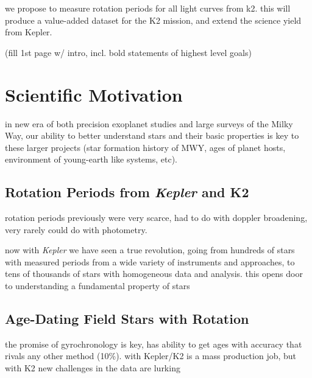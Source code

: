 \documentclass[12pt]{article}
\newcommand{\Kepler}{\textsl{Kepler}\xspace}
\begin{document}
we propose to measure rotation periods for all light curves from k2. this will produce a value-added dataset for the K2 mission, and extend the science yield from Kepler.

(fill 1st page w/ intro, incl. bold statements of highest level goals)
\clearpage



\section{Scientific Motivation}
in new era of both precision exoplanet studies and large surveys of the Milky Way, our ability to better understand stars and their basic properties is key to these larger projects (star formation history of MWY, ages of planet hosts, environment of young-earth like systems, etc).


\subsection{Rotation Periods from \Kepler and K2}
rotation periods previously were very scarce, had to do with doppler broadening, very rarely could do with photometry.

now with \Kepler we have seen a true revolution, going from hundreds of stars with measured periods from a wide variety of instruments and approaches, to tens of thousands of stars with homogeneous data and analysis. this opens door to understanding a fundamental property of stars


\subsection{Age-Dating Field Stars with Rotation}

\citet{skumanich1972}
\citet{barnes2007}
the promise of gyrochronology is key, has ability to get ages with accuracy that rivals any other method (10\%). with Kepler/K2 is a mass production job, but with K2 new challenges in the data are lurking
\end{document}
